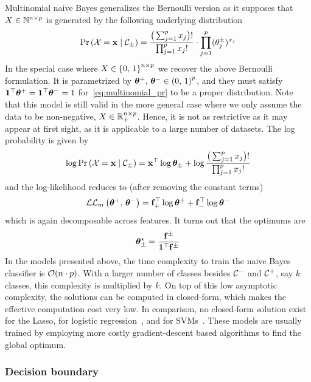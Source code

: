 Multinomial naive Bayes generalizes the Bernoulli version
as it supposes that $X \in \mathbb{N}^{n \times p}$ is generated by the following underlying distribution
\begin{equation}\label{eq:multinomial_pr}
\Pr\left( \mathcal{X} = \mathbf{x} \mid \mathcal{C}_\pm \right) =
\frac{\big( \sum_{j = 1}^p x_j \big)!}
{\prod_{j = 1}^p x_j!} \cdot \prod_{j = 1}^p (\theta^\pm_j)^{x_j}
\end{equation}
In the special case where $X \in \left\{ 0,\, 1 \right\}^{n \times p}$ we recover the above Bernoulli formulation.
It is parametrized by $\bm{\theta}^+,\, \bm{\theta}^- \in \left( 0,\, 1 \right)^p$, and they must satisfy
$\mathbf{1}^\top\bm{\theta}^+ = \mathbf{1}^\top\bm{\theta}^- = 1$ for~\ref{eq:multinomial_pr} to be a proper distribution.
Note that this model is still valid in the more general case
where we only assume the data to be non-negative, $X \in \mathbb{R}_+^{n \times p}$.
Hence, it is not as restrictive as it may appear at first sight,
as it is applicable to a large number of datasets.
The log probability is given by
\begin{equation*}
    \log\Pr\left( \mathcal{X} = \mathbf{x} \mid \mathcal{C}_\pm \right) =
    \mathbf{x}^\top\log\bm{\theta}_\pm + \log\frac{\big(\sum_{j = 1}^p x_j\big)!}{\prod_{j = 1}^p x_j!}
\end{equation*}
and the log-likelihood reduces to (after removing the constant terms)
\begin{equation}\label{eq:multinomial_snb_ll}
\mathcal{L}\mathcal{L}_m\left( \bm{\theta}^+,\, \bm{\theta}^- \right) = \mathbf{f}_+^\top\log\bm{\theta}^+ + \mathbf{f}_-^\top\log\bm{\theta}^-
\end{equation}
which is again decomposable across features.
It turns out that the optimums are
\begin{equation*}
    \bm{\theta}_\pm^\star = \frac{\mathbf{f}^\pm}{\mathbf{1}^\top\mathbf{f}^\pm}
\end{equation*}
\bigbreak
In the models presented above, the time complexity to train the naive Bayes classifier is $\mathcal{O}(n \cdot p)$.
With a larger number of classes besides $\mathcal{C}^-$ and $\mathcal{C}^+$, say $k$ classes, this complexity is multiplied by $k$.
On top of this low asymptotic complexity,
the solutions can be computed in closed-form, which makes the effective computation cost very low.
In comparison, no closed-form solution exist for the Lasso, for logistic regression~\cite{logistic_regression},
and for SVMs~\cite{svm}.
These models are usually trained by employing more costly gradient-descent based algorithms to find the global optimum.

\subsubsection{Decision boundary}\label{subsubsec:nb_bound}

